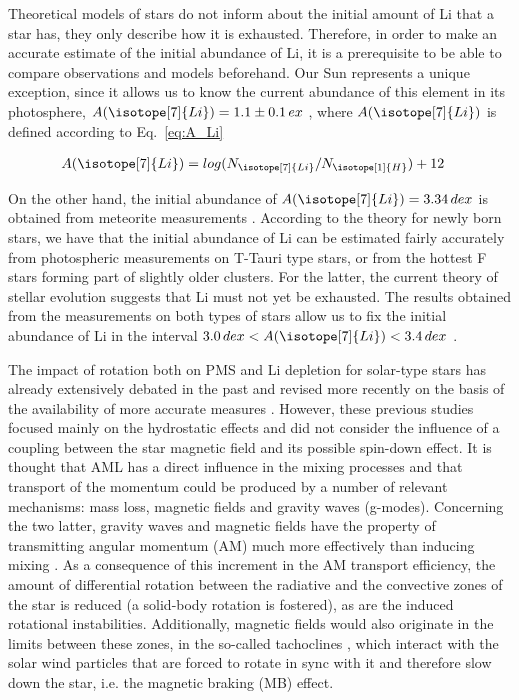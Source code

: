 \documentclass[fleqn,usenatbib]{mnras}
\begin{document}
Theoretical models of stars do not inform about the initial amount of Li that a star has, they only describe how it is exhausted. Therefore, in order to make an accurate estimate of the initial abundance of Li, it is a prerequisite to be able to compare observations and models beforehand. Our Sun represents a unique exception, since it allows us to know the current abundance of this element in its photosphere, $A(\isotope[7]{Li}) = 1.1 \pm 0.1 \, ex$ \citep{Jeffries2004}, where $A(\isotope[7]{Li})$ is defined according to Eq.~\ref{eq:A_Li}\par


\begin{ceqn}
\begin{align}
    A(\isotope[7]{Li}) &= log(N_{\isotope[7]{Li}} / N_{\isotope[1]{H}}) + 12
    \label{eq:A_Li}
\end{align}
\end{ceqn}

On the other hand, the initial abundance of $A(\isotope[7]{Li}) = 3.34 \, dex$ is obtained from meteorite measurements \citep{Randich2006}. According to the theory for newly born stars, we have that the initial abundance of Li can be estimated fairly accurately from photospheric measurements on T-Tauri type stars, or from the hottest F stars forming part of slightly older clusters. For the latter, the current theory of stellar evolution suggests that Li must not yet be exhausted. The results obtained from the measurements on both types of stars allow us to fix the initial abundance of Li in the interval $3.0 \, dex < A(\isotope[7]{Li}) < 3.4 \, dex$ \citep{Randich2006}.\par

The impact of rotation both on PMS and Li depletion for solar-type stars has already extensively debated in the past \citep{Pinsonneault1997,Jeffries2004,Somers2014} and revised more recently on the basis of the availability of more accurate measures \citep{Bouvier2016}. However, these previous studies focused mainly on the hydrostatic effects and did not consider the influence of a coupling between the star magnetic field and its possible spin-down effect. It is thought that AML has a direct influence in the mixing processes and that transport of the momentum could be produced by a number of relevant mechanisms: mass loss, magnetic fields and gravity waves (g-modes). Concerning the two latter, gravity waves \citep{Charbonnel2005} and magnetic fields \citep{Eggenberger2009} have the property of transmitting angular momentum (AM) much more effectively than inducing mixing \citep{Denissenkov2007}. As a consequence of this increment in the AM transport efficiency, the amount of differential rotation between the radiative and the convective zones of the star is reduced (a solid-body rotation is fostered), as are the induced rotational instabilities. Additionally, magnetic fields would also originate in the limits between these zones, in the so-called tachoclines \citep{Aschwanden2014, Guerrero2016}, which interact with the solar wind particles that are forced to rotate in sync with it and therefore slow down the star, i.e. the magnetic braking (MB) effect. \par
\end{document}
